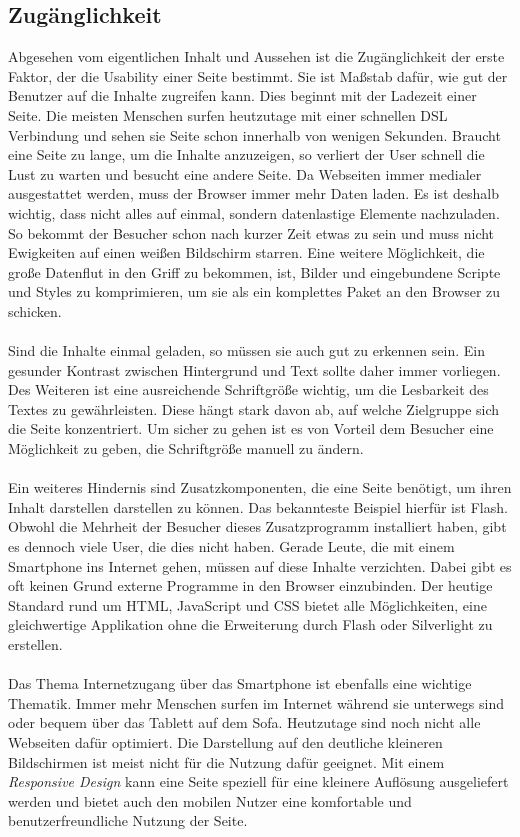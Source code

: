 \subsection{Zugänglichkeit}

Abgesehen vom eigentlichen Inhalt und Aussehen ist die Zugänglichkeit der erste Faktor, der die Usability einer Seite bestimmt. Sie ist Maßstab dafür, wie gut der Benutzer auf die Inhalte zugreifen kann. Dies beginnt mit der Ladezeit einer Seite. Die meisten Menschen surfen heutzutage mit einer schnellen DSL Verbindung und sehen sie Seite schon innerhalb von wenigen Sekunden. Braucht eine Seite zu lange, um die Inhalte anzuzeigen, so verliert der User schnell die Lust zu warten und besucht eine andere Seite. Da Webseiten immer medialer ausgestattet werden, muss der Browser immer mehr Daten laden. Es ist deshalb wichtig, dass nicht alles auf einmal, sondern datenlastige Elemente nachzuladen. So bekommt der Besucher schon nach kurzer Zeit etwas zu sein und muss nicht Ewigkeiten auf einen weißen Bildschirm starren. Eine weitere Möglichkeit, die große Datenflut in den Griff zu bekommen, ist, Bilder und eingebundene Scripte und Styles zu komprimieren, um sie als ein komplettes Paket an den Browser zu schicken.\\
\\
Sind die Inhalte einmal geladen, so müssen sie auch gut zu erkennen sein. Ein gesunder Kontrast zwischen Hintergrund und Text sollte daher immer vorliegen. Des Weiteren ist eine ausreichende Schriftgröße wichtig, um die Lesbarkeit des Textes zu gewährleisten. Diese hängt stark davon ab, auf welche Zielgruppe sich die Seite konzentriert. Um sicher zu gehen ist es von Vorteil dem Besucher eine Möglichkeit zu geben, die Schriftgröße manuell zu ändern.\\
\\
Ein weiteres Hindernis sind Zusatzkomponenten, die eine Seite benötigt, um ihren Inhalt darstellen darstellen zu können. Das bekannteste Beispiel hierfür ist Flash. Obwohl die Mehrheit der Besucher dieses Zusatzprogramm installiert haben, gibt es dennoch viele User, die dies nicht haben. Gerade Leute, die mit einem Smartphone ins Internet gehen, müssen auf diese Inhalte verzichten. Dabei gibt es oft keinen Grund externe Programme in den Browser einzubinden. Der heutige Standard rund um HTML, JavaScript und CSS bietet alle Möglichkeiten, eine gleichwertige Applikation ohne die Erweiterung durch Flash oder Silverlight zu erstellen.\\
\\
Das Thema Internetzugang über das Smartphone ist ebenfalls eine wichtige Thematik. Immer mehr Menschen surfen im Internet während sie unterwegs sind oder bequem über das Tablett auf dem Sofa. Heutzutage sind noch nicht alle Webseiten dafür optimiert. Die Darstellung auf den deutliche kleineren Bildschirmen ist meist nicht für die Nutzung dafür geeignet. Mit einem \textit{Responsive Design} kann eine Seite speziell für eine kleinere Auflösung ausgeliefert werden und bietet auch den mobilen Nutzer eine komfortable und benutzerfreundliche Nutzung der Seite.


